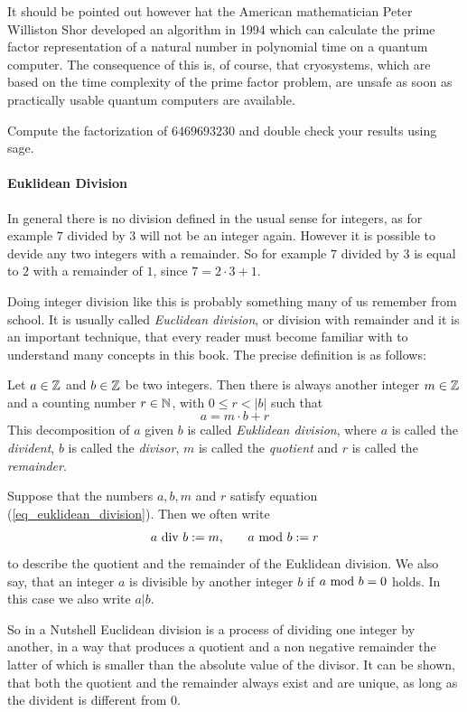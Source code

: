 It should be pointed out however hat the American mathematician Peter Williston Shor developed an algorithm in 1994 which can calculate the prime factor representation of a natural number in polynomial time on a quantum computer. The consequence of this is, of course, that cryosystems, which are based on the time complexity of the prime factor problem, are unsafe as soon as practically usable quantum computers are available.
\begin{exercise}
Compute the factorization of $6469693230$ and double check your results using sage.
\end{exercise}

\paragraph{Euklidean Division}
\label{Euklidean_division}
In general there is no division defined in the usual sense for integers, as for example $7$ divided by $3$ will not be an integer again. However it is possible to devide any two integers with a remainder. So for example $7$ divided by $3$ is equal to $2$ with a remainder of $1$, since $7 = 2\cdot 3 + 1$. 

Doing integer division like this is probably something many of us remember from school. It is 
usually called \textit{Euclidean division}, or division with remainder and it is an important technique, that every reader must become familiar with to understand many concepts in this book. The precise definition is as follows:

Let $ a \in \mathbb{Z} $ and $ b \in \mathbb{Z} $ be two integers. Then there is always another integer $ m \in \mathbb{Z} $ and a counting number $ r \in \mathbb{N} $, with $ 0 \leq r <|b| $ such that
\begin{equation}
\label{eq_euklidean_division}
a = m \cdot b + r
\end{equation}
This decomposition of $a$ given $b$ is called \textit{Euklidean division}, where $ a $ is called the \textit{divident}, $ b $ is called the \textit{divisor}, $m$ is called the \textit{quotient} and $r$ is called the \textit{remainder}. 
\begin{notation}
\label{eq_euklidean_division_notation}
Suppose that the numbers $ a, b, m $ and $ r $ satisfy equation (\ref{eq_euklidean_division}). Then we often write 
\begin{equation}
\label{def_integer_division_and_modulus}
\begin{array}{lcr}
a \text{ div } b: = m, & & a \text{ mod } b: = r 
\end{array}
\end{equation}
to describe the quotient and the remainder of the Euklidean division. We also say, that an integer $ a $ is divisible by another integer $ b $ if $ a \text{ mod } b = 0 $ holds. In this case we also write $ a | b $.
\end{notation}
So in a Nutshell Euclidean division is a process of dividing one integer by another, in a way that produces a quotient and a non negative remainder the latter of which is smaller than the absolute value of the divisor. It can be shown, that both the quotient and the remainder always exist and are unique, as long as the divident is different from $0$.

